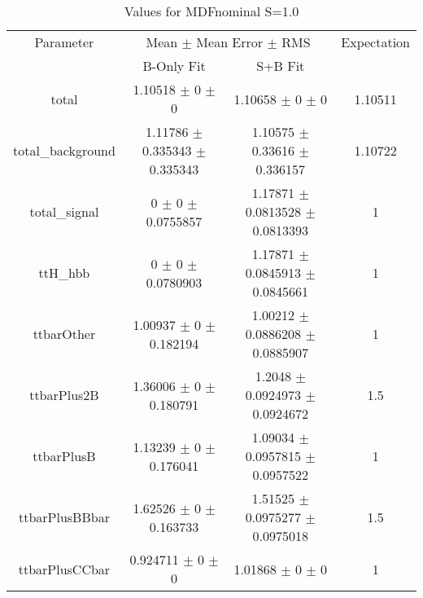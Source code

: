 \begin{table}
\centering
\caption{Values for MDFnominal S=1.0}
\begin{tabular}{cccc}
\toprule
Parameter & \multicolumn{2}{c}{Mean $\pm$ Mean Error $\pm$ RMS} & Expectation\\
 & B-Only Fit & S+B Fit & \\
\midrule
total & \num{1.10518} $\pm$ \num{0} $\pm$ \num{0} & \num{1.10658} $\pm$ \num{0} $\pm$ \num{0} & \num{1.10511}\\
total\_background & \num{1.11786} $\pm$ \num{0.335343} $\pm$ \num{0.335343} & \num{1.10575} $\pm$ \num{0.33616} $\pm$ \num{0.336157} & \num{1.10722}\\
total\_signal & \num{0} $\pm$ \num{0} $\pm$ \num{0.0755857} & \num{1.17871} $\pm$ \num{0.0813528} $\pm$ \num{0.0813393} & \num{1}\\
ttH\_hbb & \num{0} $\pm$ \num{0} $\pm$ \num{0.0780903} & \num{1.17871} $\pm$ \num{0.0845913} $\pm$ \num{0.0845661} & \num{1}\\
ttbarOther & \num{1.00937} $\pm$ \num{0} $\pm$ \num{0.182194} & \num{1.00212} $\pm$ \num{0.0886208} $\pm$ \num{0.0885907} & \num{1}\\
ttbarPlus2B & \num{1.36006} $\pm$ \num{0} $\pm$ \num{0.180791} & \num{1.2048} $\pm$ \num{0.0924973} $\pm$ \num{0.0924672} & \num{1.5}\\
ttbarPlusB & \num{1.13239} $\pm$ \num{0} $\pm$ \num{0.176041} & \num{1.09034} $\pm$ \num{0.0957815} $\pm$ \num{0.0957522} & \num{1}\\
ttbarPlusBBbar & \num{1.62526} $\pm$ \num{0} $\pm$ \num{0.163733} & \num{1.51525} $\pm$ \num{0.0975277} $\pm$ \num{0.0975018} & \num{1.5}\\
ttbarPlusCCbar & \num{0.924711} $\pm$ \num{0} $\pm$ \num{0} & \num{1.01868} $\pm$ \num{0} $\pm$ \num{0} & \num{1}\\
\bottomrule
\end{tabular}
\end{table}
